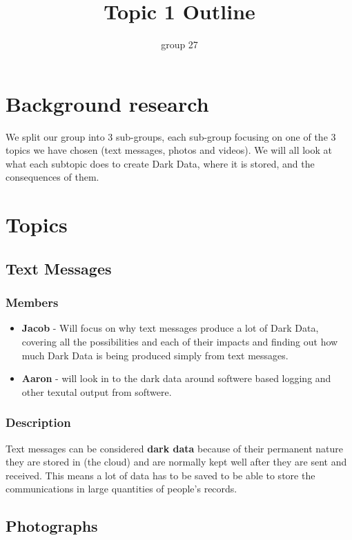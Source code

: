 \documentclass{article}
\begin{document}
\title{Topic 1 Outline}
\author{group 27}

\maketitle
\newpage

\section{Background research}
We split our group into 3 sub-groups, each sub-group focusing on one of the 3 topics we have chosen (text messages,
photos and videos). We will all look at what each subtopic does to create Dark Data, where it is stored, and the
consequences of them.

\section{Topics}
    \subsection{Text Messages} 
        \subsubsection{Members}
        \begin{itemize}
            \item \textbf{Jacob} - Will focus on why text messages produce a lot of Dark Data, covering all the 
            possibilities and each of their impacts and finding out how much Dark Data is being produced simply from text 
            messages.
            \item \textbf{Aaron} - will look in to the dark data around softwere based logging and other texutal output from softwere.

        \end{itemize}
        \subsubsection{Description}
        Text messages can be considered \textbf{dark data} because of their permanent nature they are stored in (the cloud) and 
        are normally kept well after they are sent and received. This means a lot of data has to be saved to be able to
        store the communications in large quantities of people's records. 
    \subsection{Photographs}
\end{document}
